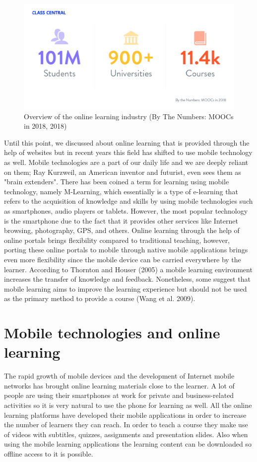 \documentclass[11]{article}
\begin{document}
\begin{figure}[H]
	\includegraphics[scale=0.45]{stats.png}
	\caption{Overview of the online learning industry (By The Numbers: MOOCs in 2018, 2018)}	
\end{figure}
\indent
	Until this point, we discussed about online learning that is provided through the help of websites but in recent years this field has shifted to  use  mobile technology as well.  Mobile technologies are a part of our daily life and we are deeply reliant on them; Ray Kurzweil, an American inventor and futurist, even sees them as "brain extenders". There has been coined a term for learning using mobile technology, namely M-Learning, which essentially is a type of e-learning that refers to the acquisition of knowledge and skills by using mobile technologies such as smartphones, audio players or tablets. However, the most popular technology is the smartphone due to the fact that it provides other services like Internet browsing, photography, GPS, and others. Online learning through the help of online portals brings flexibility compared to traditional teaching, however, porting these online portals to mobile through native mobile applications brings even more flexibility  since the mobile device can be carried everywhere by the learner. According to Thornton and Houser (2005) a mobile learning environment increases the transfer of knowledge and feedback. Nonetheless, some suggest that mobile learning aims to improve the learning experience but should not be used as the primary method to provide a course (Wang et al. 2009). 
\newpage

\section{Mobile technologies and online learning}
   The rapid growth of mobile devices and the development of Internet mobile networks has brought online learning materials close to the learner. A lot of  people  are using their smartphones at work for private and business-related activities so it is very natural to use the phone for learning as well. 
	All the online learning platforms have developed their mobile applications in order to increase the number of learners they can reach. In order to teach a course they make use of videos with subtitles, quizzes, assignments and presentation slides. Also when using the mobile learning applications the learning content can be downloaded so offline access to it is possible. 
\end{document}
